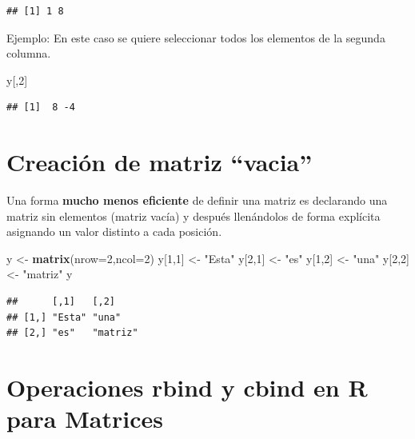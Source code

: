 \documentclass[
]{book}
\newenvironment{Shaded}{\begin{snugshade}}{\end{snugshade}}
\newcommand{\AttributeTok}[1]{\textcolor[rgb]{0.13,0.29,0.53}{#1}}
\newcommand{\DecValTok}[1]{\textcolor[rgb]{0.00,0.00,0.81}{#1}}
\newcommand{\FunctionTok}[1]{\textcolor[rgb]{0.13,0.29,0.53}{\textbf{#1}}}
\newcommand{\NormalTok}[1]{#1}
\newcommand{\OtherTok}[1]{\textcolor[rgb]{0.56,0.35,0.01}{#1}}
\newcommand{\StringTok}[1]{\textcolor[rgb]{0.31,0.60,0.02}{#1}}
\begin{document}
\begin{verbatim}
## [1] 1 8
\end{verbatim}

Ejemplo: En este caso se quiere seleccionar todos los elementos de la segunda columna.

\begin{Shaded}
\begin{Highlighting}[]
\NormalTok{y[,}\DecValTok{2}\NormalTok{]}
\end{Highlighting}
\end{Shaded}

\begin{verbatim}
## [1]  8 -4
\end{verbatim}

\section{Creación de matriz ``vacia''}\label{creaciuxf3n-de-matriz-vacia}

Una forma \textbf{mucho menos eficiente} de definir una matriz es declarando una matriz sin elementos (matriz vacía) y después llenándolos de forma explícita asignando un valor distinto a cada posición.

\begin{Shaded}
\begin{Highlighting}[]
\NormalTok{ y }\OtherTok{\textless{}{-}} \FunctionTok{matrix}\NormalTok{(}\AttributeTok{nrow=}\DecValTok{2}\NormalTok{,}\AttributeTok{ncol=}\DecValTok{2}\NormalTok{)}
\NormalTok{y[}\DecValTok{1}\NormalTok{,}\DecValTok{1}\NormalTok{] }\OtherTok{\textless{}{-}} \StringTok{"Esta"}
\NormalTok{y[}\DecValTok{2}\NormalTok{,}\DecValTok{1}\NormalTok{] }\OtherTok{\textless{}{-}} \StringTok{"es"}
\NormalTok{y[}\DecValTok{1}\NormalTok{,}\DecValTok{2}\NormalTok{] }\OtherTok{\textless{}{-}} \StringTok{"una"}
\NormalTok{y[}\DecValTok{2}\NormalTok{,}\DecValTok{2}\NormalTok{] }\OtherTok{\textless{}{-}} \StringTok{"matriz"}
\NormalTok{y}
\end{Highlighting}
\end{Shaded}

\begin{verbatim}
##      [,1]   [,2]    
## [1,] "Esta" "una"   
## [2,] "es"   "matriz"
\end{verbatim}

\section{Operaciones rbind y cbind en R para Matrices}\label{operaciones-rbind-y-cbind-en-r-para-matrices}
\end{document}
